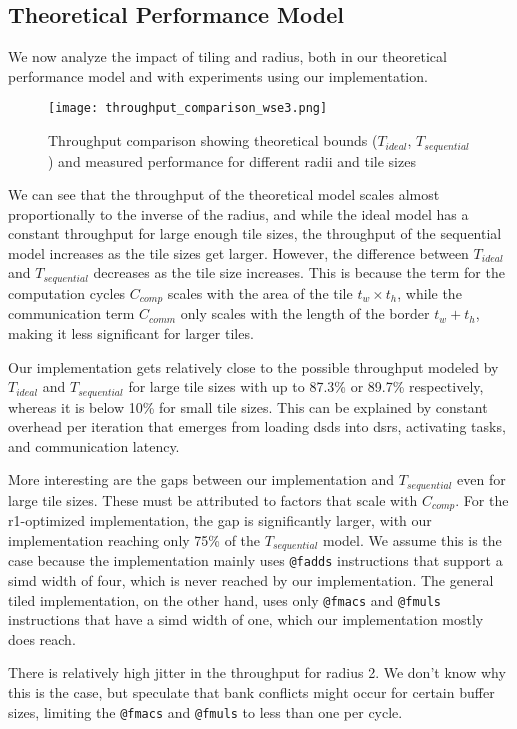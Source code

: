 \subsection{Theoretical Performance Model}
\label{sec:perf_model_validation}
We now analyze the impact of tiling and radius, both in our theoretical performance model and with experiments using our implementation.
\begin{figure}[h]
    \centering
    \texttt{[image: throughput\_comparison\_wse3.png]}
    \caption{Throughput comparison showing theoretical bounds ($T_{ideal}$, $T_{sequential}$) and measured performance for different radii and tile sizes}
    \label{fig:throughput_comparison_wse3}
\end{figure}
We can see that the throughput of the theoretical model scales almost proportionally to the inverse of the radius, and while the ideal model has a constant throughput for large enough tile sizes, the throughput of the sequential model increases as the tile sizes get larger.
However, the difference between $T_{ideal}$ and $T_{sequential}$ decreases as the tile size increases. This is because the term for the computation cycles $C_{comp}$ scales with the area of the tile $t_w \times t_h$, while the communication term $C_{comm}$ only scales with the length of the border $t_w+t_h$, making it less significant for larger tiles.

Our implementation gets relatively close to the possible throughput modeled by $T_{ideal}$ and $T_{sequential}$ for large tile sizes with up to 87.3\% or 89.7\% respectively, whereas it is below 10\% for small tile sizes. This can be explained by constant overhead per iteration that emerges from loading \acp{dsd} into \acp{dsr}, activating tasks, and communication latency.

More interesting are the gaps between our implementation and $T_{sequential}$ even for large tile sizes. These must be attributed to factors that scale with $C_{comp}$. For the r1-optimized implementation, the gap is significantly larger, with our implementation reaching only 75\% of the $T_{sequential}$ model. We assume this is the case because the implementation mainly uses \texttt{@fadds} instructions that support a \ac{simd} width of four, which is never reached by our implementation. The general tiled implementation, on the other hand, uses only \texttt{@fmacs} and \texttt{@fmuls} instructions that have a \ac{simd} width of one, which our implementation mostly does reach.

There is relatively high jitter in the throughput for radius 2. We don't know why this is the case, but speculate that bank conflicts might occur for certain buffer sizes, limiting the \texttt{@fmacs} and \texttt{@fmuls} to less than one per cycle.

